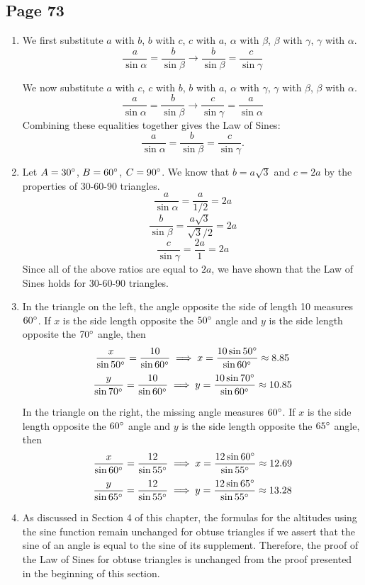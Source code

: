 \documentclass{article}
\newenvironment{solutions}[1]
{\subsection*{#1}
 \begin{enumerate}[leftmargin=1.5em]}
{\end{enumerate}}
\newcommand{\solution}{\item}
\begin{document}
\begin{solutions}{Page 73}
\solution %
We first substitute $a$ with $b$, $b$ with $c$, $c$ with $a$, $\alpha$ with $\beta$, $\beta$ with $\gamma$, $\gamma$ with $\alpha$.
\[
\dfrac{a}{\sin{\alpha}} = \dfrac{b}{\sin{\beta}} \to \dfrac{b}{\sin{\beta}} = \dfrac{c}{\sin{\gamma}} 
\]

We now substitute $a$ with $c$, $c$ with $b$, $b$ with $a$, $\alpha$ with $\gamma$, $\gamma$ with $\beta$, $\beta$ with $\alpha$.
\[
\dfrac{a}{\sin{\alpha}} = \dfrac{b}{\sin{\beta}} \to \dfrac{c}{\sin{\gamma}} = \dfrac{a}{\sin{\alpha}} 
\]
Combining these equalities together gives the Law of Sines:
\[
\dfrac{a}{\sin{\alpha}} = \dfrac{b}{\sin{\beta}} = \dfrac{c}{\sin{\gamma}}. 
\]

\solution %
Let $A=30\degree$, $B=60\degree$, $C=90\degree$. We know that $b=a\sqrt{3}$ and $c=2a$ by the properties of 30-60-90 triangles.
\[
\dfrac{a}{\sin{\alpha}} = \dfrac{a}{1/2} = 2a
\]
\[
\dfrac{b}{\sin{\beta}} = \dfrac{a\sqrt{3}}{\sqrt{3} / 2} = 2a
\]
\[
\dfrac{c}{\sin{\gamma}} = \dfrac{2a}{1} = 2a
\]
Since all of the above ratios are equal to $2a$, we have shown that the Law of Sines holds for 30-60-90 triangles.

\solution %
In the triangle on the left, the angle opposite the side of length 10 measures $60\degree$. If $x$ is the side length opposite the $50\degree$ angle and $y$ is the side length opposite the $70\degree$ angle, then
\[
\dfrac{x}{\sin{50\degree}} = \dfrac{10}{\sin{60\degree}} \implies x = \dfrac{10\sin{50\degree}}{\sin{60\degree}} \approx 8.85
\]
\[
\dfrac{y}{\sin{70\degree}} = \dfrac{10}{\sin{60\degree}} \implies y = \dfrac{10\sin{70\degree}}{\sin{60\degree}} \approx 10.85
\]

In the triangle on the right, the missing angle measures $60\degree$. If $x$ is the side length opposite the $60\degree$ angle and $y$ is the side length opposite the $65\degree$ angle, then
\[
\dfrac{x}{\sin{60\degree}} = \dfrac{12}{\sin{55\degree}} \implies x = \dfrac{12\sin{60\degree}}{\sin{55\degree}} \approx 12.69
\]
\[
\dfrac{y}{\sin{65\degree}} = \dfrac{12}{\sin{55\degree}} \implies y = \dfrac{12\sin{65\degree}}{\sin{55\degree}} \approx 13.28
\]

\solution %
As discussed in Section 4 of this chapter, the formulas for the altitudes using the sine function remain unchanged for obtuse triangles if we assert that the sine of an angle is equal to the sine of its supplement. Therefore, the proof of the Law of Sines for obtuse triangles is unchanged from the proof presented in the beginning of this section.


\end{solutions}
\end{document}
